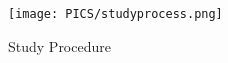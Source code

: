 




\begin{figure}
    \centering
    \texttt{[image: PICS/studyprocess.png]}
    \caption{Study Procedure}
    \label{fig: study design}
\end{figure}